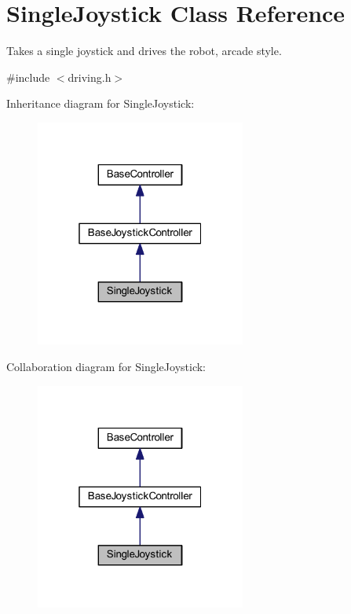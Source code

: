 \hypertarget{class_single_joystick}{\section{\-Single\-Joystick \-Class \-Reference}
\label{class_single_joystick}
}


\-Takes a single joystick and drives the robot, arcade style.  




{\ttfamily \#include $<$driving.\-h$>$}



\-Inheritance diagram for \-Single\-Joystick\-:\nopagebreak
\begin{figure}[H]
\begin{center}
\leavevmode
\includegraphics[width=196pt]{class_single_joystick__inherit__graph}
\end{center}
\end{figure}


\-Collaboration diagram for \-Single\-Joystick\-:\nopagebreak
\begin{figure}[H]
\begin{center}
\leavevmode
\includegraphics[width=196pt]{class_single_joystick__coll__graph}
\end{center}
\end{figure}
